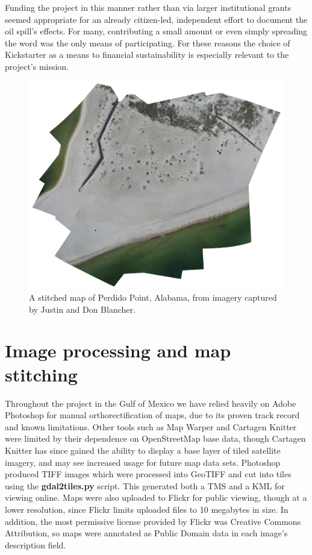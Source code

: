 \documentclass[11pt,oneside,notitlepage]{report}
\begin{document}
Funding the project in this manner rather than via larger institutional grants seemed appropriate for an already citizen-led, independent effort to document the oil spill's effects. For many, contributing a small amount or even simply spreading the word was the only means of participating. For these reasons the choice of Kickstarter as a means to financial sustainability is especially relevant to the project's mission. 

\begin{figure}[p]
  \begin{center}
	\includegraphics[width=1\textwidth]{images/perdido-point.jpg}
	\caption{A stitched map of Perdido Point, Alabama, from imagery captured by Justin and Don Blancher.}
  \end{center}
\end{figure}

\section{Image processing and map stitching}

Throughout the project in the Gulf of Mexico we have relied heavily on Adobe Photoshop for manual orthorectification of maps, due to its proven track record and known limitations. Other tools such as Map Warper and Cartagen Knitter were limited by their dependence on OpenStreetMap base data, though Cartagen Knitter has since gained the ability to display a base layer of tiled satellite imagery, and may see increased usage for future map data sets. Photoshop produced \ac{TIFF} images which were processed into \ac{GeoTIFF} and cut into tiles using the \textbf{gdal2tiles.py} script. This generated both a \ac{TMS} and a \ac{KML} for viewing online. Maps were also uploaded to Flickr for public viewing, though at a lower resolution, since Flickr limits uploaded files to 10 megabytes in size. In addition, the most permissive license provided by Flickr was Creative Commons Attribution, so maps were annotated as Public Domain data in each image's description field. 
\end{document}
